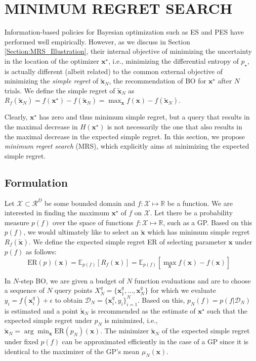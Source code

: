 \documentclass[10pt,letterpaper]{article} %
\begin{document}
\section{MINIMUM REGRET SEARCH} \label{Section:MRS}

Information-based policies for Bayesian optimization such as ES and PES
have performed well empirically. However, as we discuss in Section \ref{Section:MRS_Illustration},
their internal objective of minimizing
the uncertainty in the location of the optimizer $\mathbf{x}^\star$, i.e.,
minimizing the differential entropy of $p_\star$, is actually different (albeit
related) to the common external objective of minimizing the \emph{simple regret} of
$\mathbf{\tilde x}_N$, the recommendation of BO for $\mathbf{x}^\star$ after $N$
trials. We define the simple regret of $\mathbf{\tilde x}_N$ as
$R_f(\mathbf{\tilde  x}_N) = f(\mathbf{x}^\star) - f(\mathbf{\tilde  x}_N) = \max_{\mathbf{x}} f(\mathbf{x}) - f(\mathbf{\tilde x}_N)$.

Clearly, $\mathbf{x}^\star$ has zero and thus minimum simple regret, but a query that
results in the maximal decrease in $H(\mathbf{x}^\star)$ is not necessarily the
one that also results in the maximal decrease in the expected simple regret. 
In this section, we propose \emph{minimum regret search} (MRS), 
which explicitly aims at minimizing the expected simple
regret.

\subsection{Formulation}
Let $\mathcal{X} \subset \mathcal{R}^D$ be some bounded domain and $f: \mathcal{X} \mapsto
\mathbb{R}$ be a function. We are interested in finding the maximum
$\mathbf{x}^\star$ of $f$ on $\mathcal{X}$. Let there be a probability measure
$p(f)$ over the space of functions $f: \mathcal{X} \mapsto \mathbb{R}$, such as
a GP. Based on this $p(f)$, we would ultimately like to
select an $\mathbf{\tilde x}$ which has minimum simple regret
$R_f(\mathbf{\tilde x})$. We define the expected simple regret ER of
selecting parameter $\mathbf{x}$ under $p(f)$ as follows:
$$\text{ER}(p)(\mathbf{x}) = \mathbb{E}_{p(f)}[R_f(\mathbf{x})]
= \mathbb{E}_{p(f)}[\max_{\mathbf{x}} f(\mathbf{x}) - f(\mathbf{
x})]$$

In $N$-step BO, we are given a budget of $N$ function evaluations and are to choose a sequence of $N$ query points
$X^q_N=\{\mathbf{x}^q_1, \dots, \mathbf{x}^q_N\}$ for which we evaluate $y_i = f(\mathbf{x}^q_i) +
\epsilon$ to obtain $\mathcal{D}_N = \{\mathbf{x}^q_i, y_i\}_{i=1}^N$. Based on this, 
 $p_N(f) = p(f \vert \mathcal{D}_N)$ is estimated and a point
$\mathbf{\tilde x}_N$ is recommended as the estimate of $\mathbf{x}^\star$ such that the
expected simple regret under $p_N$ is minimized, i.e., $\mathbf{\tilde x}_N = \arg\min_\mathbf{x}
\text{ER}(p_N)(\mathbf{x})$.
The minimizer $\mathbf{\tilde x}_N$ of the expected simple regret under fixed
$p(f)$ can be approximated efficiently in the case of a GP since it is
identical to the maximizer of the GP's mean $\mu_N(\mathbf{x})$. 
\end{document}
